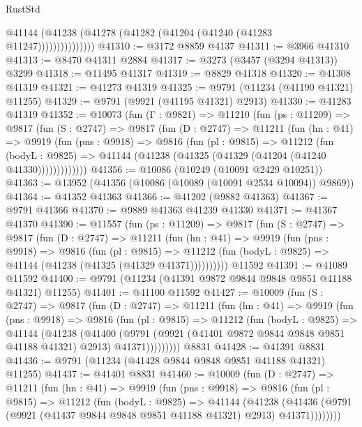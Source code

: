 \begin{lexlean}{RustStd}
\begin{coremodule}
                    @41144 (@41238 (@41278 (@41282 (@41204 (@41240 (@41283 @11247)))))))))))))))
@41310 := @3172 @8859 @4137
@41311 := @3966 @41310
@41313 := @8470 @41311 @2884
@41317 := @3273 (@3457 (@3294 @41313)) @3299
@41318 := @11495 @41317
@41319 := @8829 @41318
@41320 := @41308 @41319
@41321 := @41273 @41319
@41325 := @9791 (@11234 (@41190 @41321) @11255)
@41329 := @9791 (@9921 (@41195 @41321) @2913)
@41330 := @41283 @41319
@41352 := @10073
    (fun (Γ : @9821) =>
    @11210
      (fun (ps : @11209) =>
      @9817
        (fun (S : @2747) =>
        @9817
          (fun (D : @2747) =>
          @11211
            (fun (hn : @41) =>
            @9919
              (fun (pns : @9918) =>
              @9816
                (fun (pl : @9815) =>
                @11212
                  (fun (bodyL : @9825) =>
                  @41144 (@41238 (@41325 (@41329 (@41204 (@41240 @41330)))))))))))))
@41356 := @10086 (@10249 (@10091 @2429 @10251))
@41363 := @13952 (@41356 (@10086 (@10089 (@10091 @2534 @10094)) @9869))
@41364 := @41352 @41363
@41366 := @41202 (@9882 @41363)
@41367 := @9791 @41366
@41370 := @9889 @41363 @41239 @41330
@41371 := @41367 @41370
@41390 := @11557
    (fun (ps : @11209) =>
    @9817
      (fun (S : @2747) =>
      @9817
        (fun (D : @2747) =>
        @11211
          (fun (hn : @41) =>
          @9919
            (fun (pns : @9918) =>
            @9816
              (fun (pl : @9815) =>
              @11212 (fun (bodyL : @9825) => @41144 (@41238 (@41325 (@41329 @41371))))))))))
    @11592
@41391 := @41089 @11592
@41400 := @9791 (@11234 (@41391 @9872 @9844 @9848 @9851 @41188 @41321) @11255)
@41401 := @41100 @11592
@41427 := @10009
    (fun (S : @2747) =>
    @9817
      (fun (D : @2747) =>
      @11211
        (fun (hn : @41) =>
        @9919
          (fun (pns : @9918) =>
          @9816
            (fun (pl : @9815) =>
            @11212
              (fun (bodyL : @9825) =>
              @41144
                (@41238
                  (@41400
                    (@9791
                      (@9921 (@41401 @9872 @9844 @9848 @9851 @41188 @41321) @2913)
                      @41371)))))))))
    @8831
@41428 := @41391 @8831
@41436 := @9791 (@11234 (@41428 @9844 @9848 @9851 @41188 @41321) @11255)
@41437 := @41401 @8831
@41460 := @10009
    (fun (D : @2747) =>
    @11211
      (fun (hn : @41) =>
      @9919
        (fun (pns : @9918) =>
        @9816
          (fun (pl : @9815) =>
          @11212
            (fun (bodyL : @9825) =>
            @41144
              (@41238
                (@41436 (@9791 (@9921 (@41437 @9844 @9848 @9851 @41188 @41321) @2913) @41371))))))))

\end{coremodule}
\end{lexlean}
